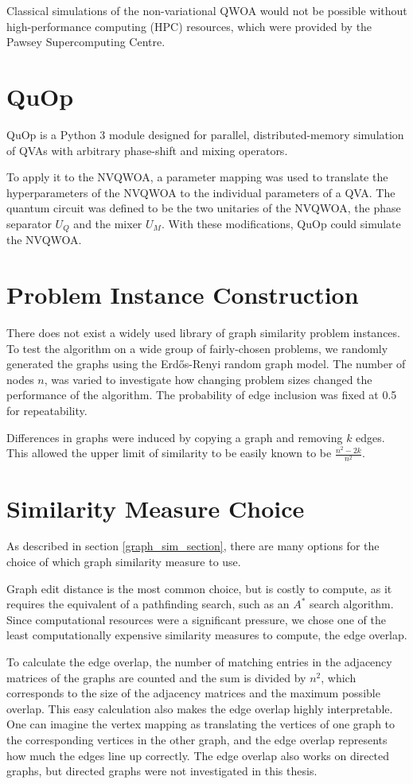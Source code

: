 Classical simulations of the non-variational QWOA would not be possible without high-performance computing (HPC) resources, which were provided by the Pawsey Supercomputing Centre.

\section{QuOp}
QuOp is a Python 3 module designed for parallel, distributed-memory simulation of QVAs with arbitrary phase-shift and mixing operators. 

To apply it to the NVQWOA, a parameter mapping was used to translate the hyperparameters of the NVQWOA to the individual parameters of a QVA. The quantum circuit was defined to be the two unitaries of the NVQWOA, the phase separator $U_Q$ and the mixer $U_M$. With these modifications, QuOp could simulate the NVQWOA.

\section{Problem Instance Construction}
There does not exist a widely used library of graph similarity problem instances. To test the algorithm on a wide group of fairly-chosen problems, we randomly generated the graphs using the Erdős-Renyi random graph model.
The number of nodes $n$, was varied to investigate how changing problem sizes changed the performance of the algorithm. The probability of edge inclusion was fixed at 0.5 for repeatability.

Differences in graphs were induced by copying a graph and removing $k$ edges. This allowed the upper limit of similarity to be easily known to be $\frac{n^2-2k}{n^2}$.

\section{Similarity Measure Choice}
As described in section \ref{graph_sim_section}, there are many options for the choice of which graph similarity measure to use.

Graph edit distance is the most common choice, but is costly to compute, as it requires the equivalent of a pathfinding search, such as an $A^*$ search algorithm.
Since computational resources were a significant pressure, we chose one of the least computationally expensive similarity measures to compute, the edge overlap.

To calculate the edge overlap, the number of matching entries in the adjacency matrices of the graphs are counted and the sum is divided by $n^2$, which corresponds to the size of the adjacency matrices and the maximum possible overlap. This easy calculation also makes the edge overlap highly interpretable. One can imagine the vertex mapping as translating the vertices of one graph to the corresponding vertices in the other graph, and the edge overlap represents how much the edges line up correctly. The edge overlap also works on directed graphs, but directed graphs were not investigated in this thesis.

